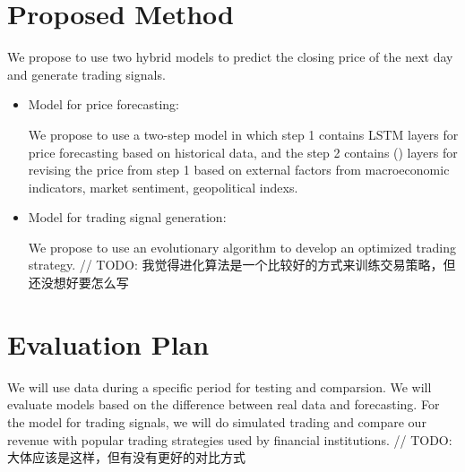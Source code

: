 \documentclass[12pt, a4paper]{article}
\begin{document}
\section{Proposed Method}
We propose to use two hybrid models to predict the closing price of the next day and generate trading signals.
\begin{itemize}
    \item Model for price forecasting:
    
    We propose to use a two-step model in which step 1 contains LSTM layers for price forecasting based on historical data, and the step 2 contains () layers for revising the price from step 1 based on external factors from macroeconomic indicators, market sentiment, geopolitical indexs.
    \item Model for trading signal generation:
    
    We propose to use an evolutionary algorithm to develop an optimized trading strategy. 
    // TODO: 我觉得进化算法是一个比较好的方式来训练交易策略，但还没想好要怎么写
\end{itemize}

\section{Evaluation Plan}
We will use data during a specific period for testing and comparsion. We will evaluate models based on the difference between real data and forecasting. For the model for trading signals, we will do simulated trading and compare our revenue with popular trading strategies used by financial institutions.
// TODO: 大体应该是这样，但有没有更好的对比方式
\end{document}
